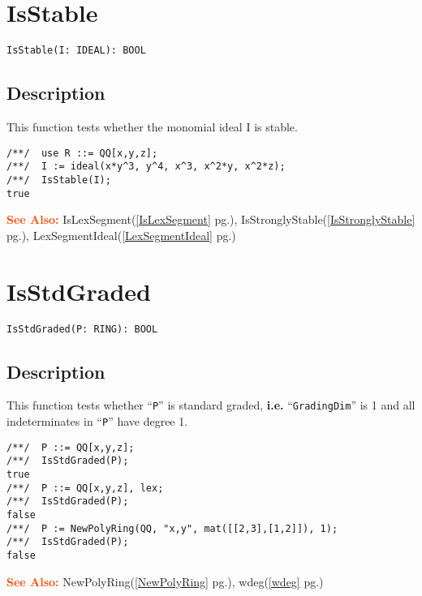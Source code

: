 \documentclass[a4paper]{mybook}
\newenvironment{command}{}{} %
\newcommand\SeeAlso{\par\textcolor{OrangeRed}{\textbf{\large See Also: }}}
\begin{document}
\section{IsStable}
\label{IsStable}
\begin{command} %


\begin{Verbatim}[label=syntax, rulecolor=\color{MidnightBlue},
frame=single]
IsStable(I: IDEAL): BOOL
\end{Verbatim}


\subsection*{Description}

This function tests whether the monomial ideal I is stable.
\begin{Verbatim}[label=example, rulecolor=\color{PineGreen}, frame=single]
/**/  use R ::= QQ[x,y,z];
/**/  I := ideal(x*y^3, y^4, x^3, x^2*y, x^2*z);
/**/  IsStable(I);
true
\end{Verbatim}


\SeeAlso %
  IsLexSegment(\ref{IsLexSegment} pg.\pageref{IsLexSegment}), 
    IsStronglyStable(\ref{IsStronglyStable} pg.\pageref{IsStronglyStable}), 
    LexSegmentIdeal(\ref{LexSegmentIdeal} pg.\pageref{LexSegmentIdeal})
\end{command} %

\section{IsStdGraded}
\label{IsStdGraded}
\begin{command} %


\begin{Verbatim}[label=syntax, rulecolor=\color{MidnightBlue},
frame=single]
IsStdGraded(P: RING): BOOL
\end{Verbatim}


\subsection*{Description}

This function tests whether ``\verb&P&'' is standard graded,
\textbf{i.e.} ``\verb&GradingDim&'' is 1 and all indeterminates
in ``\verb&P&'' have degree 1.
\begin{Verbatim}[label=example, rulecolor=\color{PineGreen}, frame=single]
/**/  P ::= QQ[x,y,z];
/**/  IsStdGraded(P);
true
/**/  P ::= QQ[x,y,z], lex;
/**/  IsStdGraded(P);
false
/**/  P := NewPolyRing(QQ, "x,y", mat([[2,3],[1,2]]), 1);
/**/  IsStdGraded(P);
false
\end{Verbatim}


\SeeAlso %
  NewPolyRing(\ref{NewPolyRing} pg.\pageref{NewPolyRing}), 
    wdeg(\ref{wdeg} pg.\pageref{wdeg})
\end{command} %
\end{document}
